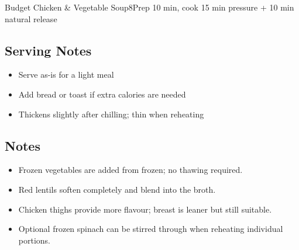 \begin{recipebox}{Budget Chicken \& Vegetable Soup}{8}{Prep 10 min, cook 15 min pressure + 10 min natural release}
\subsection*{Serving Notes}
\begin{itemize}
    \item Serve as-is for a light meal
    \item Add bread or toast if extra calories are needed
    \item Thickens slightly after chilling; thin when reheating
\end{itemize}

\subsection*{Notes}
\begin{itemize}
    \item Frozen vegetables are added from frozen; no thawing required.
    \item Red lentils soften completely and blend into the broth.
    \item Chicken thighs provide more flavour; breast is leaner but still suitable.
    \item Optional frozen spinach can be stirred through when reheating individual portions.
\end{itemize}
\end{recipebox}
